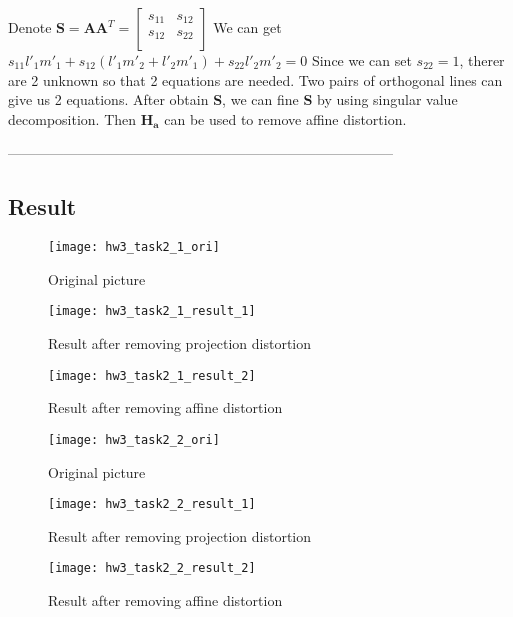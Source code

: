 \documentclass[11pt]{article}
\begin{document}
Denote $\mathbf{S} = \mathbf{A}\mathbf{A}^T = \begin{bmatrix}
s_{11} & s_{12} \\
s_{12} & s_{22} \\
\end{bmatrix} $ We can get $s_{11}l'_1m'_1 + s_{12}(l'_1m'_2+l'_2m'_1)+s_{22}l'_2m'_2 = 0$ Since we can set $s_{22} = 1$, therer are 2 unknown so that 2 equations are needed. Two pairs of orthogonal lines can give us 2 equations. After obtain $\mathbf{S}$, we can fine $\mathbf{S}$ by using singular value decomposition. Then $\mathbf{H_a}$ can be used to remove affine distortion.

-----------------------------------------------------------------------------------

\subsection*{Result}

\begin{figure}[H]
\centering
\texttt{[image: hw3\_task2\_1\_ori]}
\caption{Original picture}
\label{}
\end{figure}

\begin{figure}[H]
\centering
\texttt{[image: hw3\_task2\_1\_result\_1]}
\caption{Result after removing projection distortion}
\label{}
\end{figure}

\begin{figure}[H]
\centering
\texttt{[image: hw3\_task2\_1\_result\_2]}
\caption{Result after removing affine distortion}
\label{}
\end{figure}

\begin{figure}[H]
\centering
\texttt{[image: hw3\_task2\_2\_ori]}
\caption{Original picture}
\label{}
\end{figure}

\begin{figure}[H]
\centering
\texttt{[image: hw3\_task2\_2\_result\_1]}
\caption{Result after removing projection distortion}
\label{}
\end{figure}

\begin{figure}[H]
\centering
\texttt{[image: hw3\_task2\_2\_result\_2]}
\caption{Result after removing affine distortion}
\label{}
\end{figure}
\end{document}
